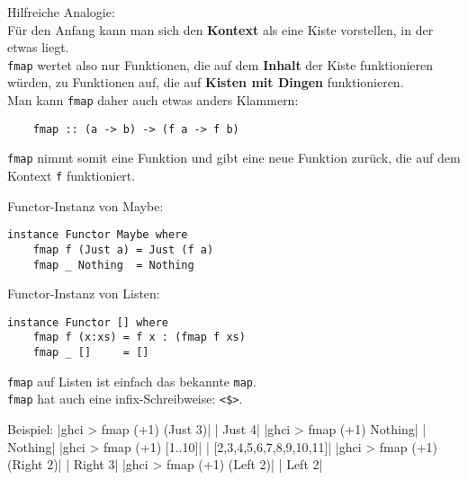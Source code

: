 \documentclass{beamer}
\begin{document}
\begin{frame}[fragile]
Hilfreiche Analogie:\\
Für den Anfang kann man sich den \textbf{Kontext} als eine Kiste vorstellen, in der etwas liegt.\\
\bigskip
\pause
\texttt{fmap} wertet also nur Funktionen, die auf dem \textbf{Inhalt} der Kiste funktionieren würden, zu Funktionen auf, die auf \textbf{Kisten mit Dingen} funktionieren.\\\bigskip
\pause
Man kann \texttt{fmap} daher auch etwas anders Klammern:
\begin{verbatim}
    fmap :: (a -> b) -> (f a -> f b)
\end{verbatim}
\texttt{fmap} nimmt somit eine Funktion und gibt eine neue Funktion zurück, die auf dem Kontext \texttt{f} funktioniert.
\end{frame}

\begin{frame}[fragile]
Functor-Instanz von Maybe:
\begin{verbatim}
instance Functor Maybe where
    fmap f (Just a) = Just (f a)
    fmap _ Nothing  = Nothing
\end{verbatim}
\begin{comment}
\pause
Functor-Instanz von Either:
\begin{verbatim}
instance Functor Either where
    fmap f (Right a) = Right (f a)
    fmap _ (Left b)  = Left b
\end{verbatim}
\end{comment}
\pause
Functor-Instanz von Listen:
\begin{verbatim}
instance Functor [] where
    fmap f (x:xs) = f x : (fmap f xs)
    fmap _ []     = []
\end{verbatim}
\texttt{fmap} auf Listen ist einfach das bekannte \texttt{map}.\\
\pause
\texttt{fmap} hat auch eine infix-Schreibweise: \texttt{<\$>}.
\end{frame}


\begin{frame}[fragile]
Beispiel:
|ghci > fmap (+1) (Just 3)|
\pause
{}|       Just 4|
|ghci > fmap (+1) Nothing|
\pause
{}|       Nothing|
|ghci > fmap (+1) [1..10]|
\pause
{}|       [2,3,4,5,6,7,8,9,10,11]|
|ghci > fmap (+1) (Right 2)|
\pause
{}|       Right 3|
|ghci > fmap (+1) (Left 2)|
\pause
{}|       Left 2|
\end{frame}
\end{document}
